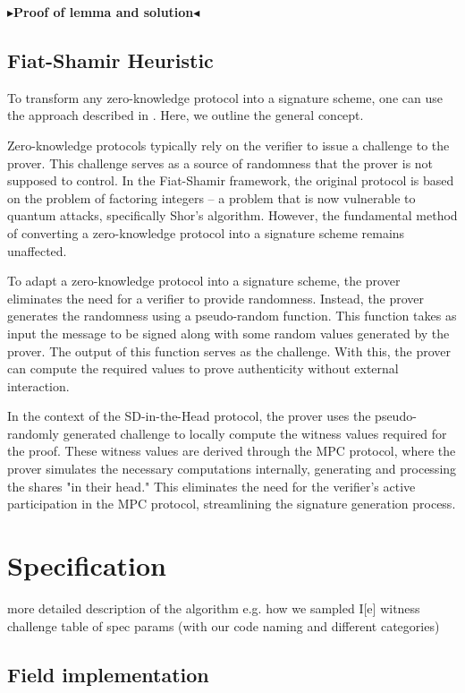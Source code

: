 \documentclass[twoside,11pt,openright]{report}
\theoremstyle{definition}
\theoremstyle{plain}
\newcommand{\todo}[1]{{\color[rgb]{.5,0,0}\textbf{$\blacktriangleright$#1$\blacktriangleleft$}}}
\begin{document}
\todo{Proof of lemma and solution}

\section{Fiat-Shamir Heuristic}\label{sec:fiatshamir}
To transform any zero-knowledge protocol into a signature scheme, one can use the approach described in \cite{fiat1986prove}. Here, we outline the general concept.

Zero-knowledge protocols typically rely on the verifier to issue a challenge to the prover. This challenge serves as a source of randomness that the prover is not supposed to control. In the Fiat-Shamir framework, the original protocol is based on the problem of factoring integers -- a problem that is now vulnerable to quantum attacks, specifically Shor's algorithm. However, the fundamental method of converting a zero-knowledge protocol into a signature scheme remains unaffected.

To adapt a zero-knowledge protocol into a signature scheme, the prover eliminates the need for a verifier to provide randomness. Instead, the prover generates the randomness using a pseudo-random function. This function takes as input the message to be signed along with some random values generated by the prover. The output of this function serves as the challenge. With this, the prover can compute the required values to prove authenticity without external interaction.

In the context of the SD-in-the-Head protocol, the prover uses the pseudo-randomly generated challenge to locally compute the witness values required for the proof. These witness values are derived through the MPC protocol, where the prover simulates the necessary computations internally, generating and processing the shares "in their head." This eliminates the need for the verifier's active participation in the MPC protocol, streamlining the signature generation process.


\chapter{Specification}\label{ch:spec}
more detailed description of the algorithm
e.g. how we sampled I[e] witness challenge
table of spec params (with our code naming and different categories)

\section{Field implementation}
\end{document}
